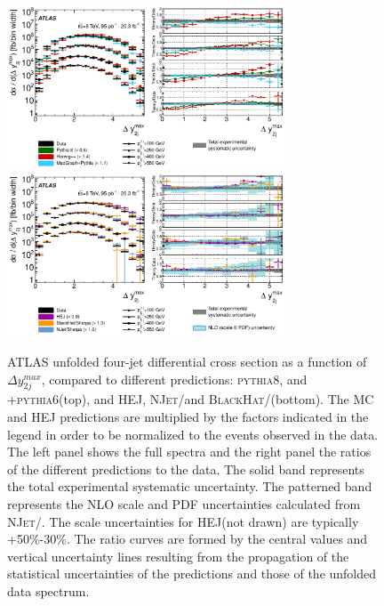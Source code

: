 \documentclass{PoS}
\providecommand{\NJET} {{\textsc{NJet}}\xspace}
\providecommand{\BLACKHAT} {{\textsc{BlackHat}}\xspace}
\providecommand{\HEJ} {{\textsc{HEJ}}\xspace}
\providecommand{\PYTHIAS} {{\textsc{pythia6}}\xspace}
\providecommand{\PYTHIAE} {{\textsc{pythia8}}\xspace}
\begin{document}
\begin{figure}[htbp]
  \centering
  \includegraphics[width=0.75\textwidth]{Figure6a.pdf}\\
  \includegraphics[width=0.75\textwidth]{Figure6b.pdf}
  \caption{ATLAS unfolded four-jet differential cross section as a function of $\Delta y_{2j}^{max}$, compared to different
    predictions: \PYTHIAE, \HERWIGpp and \MADGRAPH+\PYTHIAS (top), and HEJ, \NJET/\SHERPA and \BLACKHAT/\SHERPA (bottom). The MC
    and \HEJ predictions are multiplied by the factors indicated in the legend in order to be normalized to the events observed in the data. The left 
    panel shows the full spectra and the right panel the ratios of the different predictions to the data. The solid band represents the total experimental systematic
    uncertainty. The patterned band represents the NLO scale and PDF uncertainties calculated from
     \NJET/\SHERPA. The scale uncertainties for \HEJ (not drawn) are typically
    +50\%-30\%. The ratio curves are formed by the central values and vertical uncertainty lines resulting from the
    propagation of the statistical uncertainties of the predictions and those of the unfolded data spectrum.} 
  \label{fig:4jet}
\end{figure}
\end{document}
